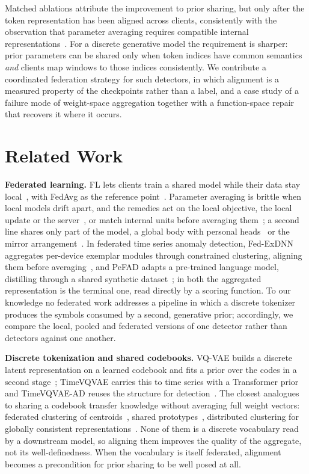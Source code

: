 \documentclass[conference]{IEEEtran}
\begin{document}
Matched ablations attribute the improvement to prior sharing, but only after the token
representation has been aligned across clients, consistently with the observation that parameter
averaging requires compatible internal
representations~\cite{entezari2022permutation,wang2020fedma}. For a discrete
generative model the requirement is sharper: prior parameters can be shared only when token indices
have common semantics \emph{and} clients map windows to those indices consistently. We contribute a
coordinated federation strategy for such detectors, in which alignment is a measured property of the
checkpoints rather than a label, and a case study of a failure mode of weight-space aggregation
together with a function-space repair that recovers it where it occurs.

\section{Related Work}

\textbf{Federated learning.} FL lets clients train a shared model while their data stay
local~\cite{kairouz2021advances}, with FedAvg as the reference point~\cite{mcmahan2017federated}.
Parameter averaging is brittle when local models drift apart, and the remedies act on the local
objective, the local update or the
server~\cite{li2020fedprox,karimireddy2020scaffold,reddi2021adaptive}, or match internal units
before averaging them~\cite{wang2020fedma}; a second line shares only part of the model, a global
body with personal heads~\cite{arivazhagan2019fedper} or the mirror
arrangement~\cite{liang2020lgfedavg}. In federated time series anomaly
detection, Fed-ExDNN aggregates per-device exemplar modules through constrained clustering, aligning
them before averaging~\cite{zhu2022fedexdnn}, and PeFAD adapts a pre-trained language model,
distilling through a shared synthetic dataset~\cite{xu2024pefad}; in both the aggregated
representation is the terminal one, read directly by a scoring function. To our knowledge no
federated work addresses a pipeline in which a discrete tokenizer produces the symbols consumed by
a second, generative prior; accordingly, we compare the local, pooled and federated versions of
one detector rather than detectors against one another.

\textbf{Discrete tokenization and shared codebooks.} VQ-VAE builds a discrete latent representation
on a learned codebook and fits a prior over the codes in a second stage~\cite{van2017neural};
TimeVQVAE carries this to time series with a Transformer prior~\cite{lee2023timevqvae} and
TimeVQVAE-AD reuses the structure for detection~\cite{lee2024timevqvaead}. The closest analogues to
sharing a codebook transfer knowledge without averaging full weight vectors: federated clustering
of centroids~\cite{dennis2021kfed}, shared prototypes~\cite{tan2022fedproto}, distributed
clustering for globally consistent representations~\cite{lubana2022orchestra}. None of them is a
discrete vocabulary read by a downstream model, so aligning them improves the quality of the
aggregate, not its well-definedness. When the vocabulary is itself federated, alignment becomes a
precondition for prior sharing to be well posed at all.
\end{document}
